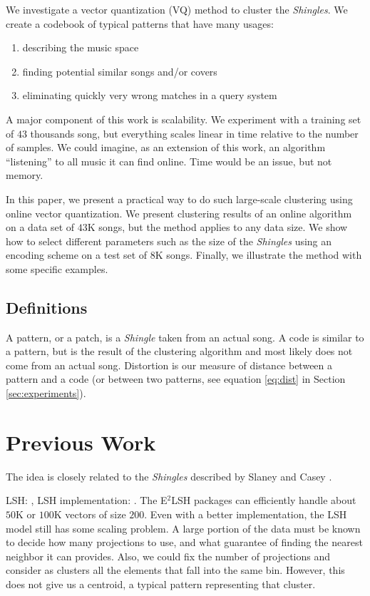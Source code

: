 \documentclass{article}
\begin{document}
We investigate a vector quantization \cite{Datar2004} (VQ) method to
cluster the \textit{Shingles}. We create a codebook of typical patterns
that have many usages:
\begin{enumerate}
\item describing the music space
\item finding potential similar songs and/or covers
\item eliminating quickly very wrong matches in a query system
\end{enumerate}


A major component of this work is scalability. We experiment with a training
set of $43$ thousands song, but everything scales linear in time
relative to the number of samples. We could imagine, as an extension
of this work, an algorithm ``listening'' to all music it can find online.
Time would be an issue, but not memory.


In this paper, we present a practical way to do such large-scale 
clustering using online vector quantization. We present clustering results 
of an online algorithm on a data set of $43$K songs, but the method applies 
to any data size. We show how to select different parameters such as the size 
of the \textit{Shingles} using an encoding scheme on a test set of $8$K songs. 
Finally, we illustrate the method with some specific examples.



\subsection{Definitions}
A pattern, or a patch, is a \textit{Shingle} taken from an actual song.
A code is similar to a pattern, but is the result of the clustering
algorithm and most likely does not come from an actual song.
Distortion is our measure of distance between a pattern and a code
(or between two patterns, see equation \ref{eq:dist} in Section 
\ref{sec:experiments}).


\section{Previous Work}\label{sec:prevwork}
The idea is closely related to the \textit{Shingles} described by
Slaney and Casey \cite{Casey2006,Casey2007,Casey2008}. 

LSH: \cite{Datar2004}, LSH implementation: \cite{E2LSH}.
The E$^2$LSH packages can efficiently handle about $50$K or $100$K
vectors of size $200$. Even with a better implementation, the LSH
model still has some scaling problem. A large portion of the data
must be known to decide how many projections to use, and what guarantee
of finding the nearest neighbor it can provides. Also, we could fix the
number of projections and consider as clusters all the elements that
fall into the same bin. However, this does not give us a centroid, a
typical pattern representing that cluster.
\end{document}
